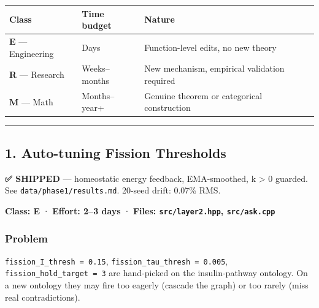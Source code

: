 \documentclass[
  11pt,
  a4paper,
]{article}
\begin{document}
\begin{longtable}[]{@{}
  >{\raggedright\arraybackslash}p{}
  >{\raggedright\arraybackslash}p{}
  >{\raggedright\arraybackslash}p{}@{}}
\toprule\noalign{}
\begin{minipage}[b]{\linewidth}\raggedright
Class
\end{minipage} & \begin{minipage}[b]{\linewidth}\raggedright
Time budget
\end{minipage} & \begin{minipage}[b]{\linewidth}\raggedright
Nature
\end{minipage} \\
\midrule\noalign{}
\endhead
\bottomrule\noalign{}
\endlastfoot
\textbf{E} --- Engineering & Days & Function-level edits, no new
theory \\
\textbf{R} --- Research & Weeks--months & New mechanism, empirical
validation required \\
\textbf{M} --- Math & Months--year+ & Genuine theorem or categorical
construction \\
\end{longtable}

\begin{center}\rule{0.5\linewidth}{0.5pt}\end{center}

\subsection{1. Auto-tuning Fission
Thresholds}\label{auto-tuning-fission-thresholds}

\textbf{✅ SHIPPED} --- homeostatic energy feedback, EMA-smoothed, k
\textgreater{} 0 guarded. See \texttt{data/phase1/results.md}. 20-seed
drift: 0.07\% RMS.

\textbf{Class: E} · \textbf{Effort: 2--3 days} · \textbf{Files:
\texttt{src/layer2.hpp}, \texttt{src/ask.cpp}}

\subsubsection{Problem}\label{problem}

\texttt{fission\_I\_thresh\ =\ 0.15},
\texttt{fission\_tau\_thresh\ =\ 0.005},
\texttt{fission\_hold\_target\ =\ 3} are hand-picked on the
insulin-pathway ontology. On a new ontology they may fire too eagerly
(cascade the graph) or too rarely (miss real contradictions).
\end{document}
